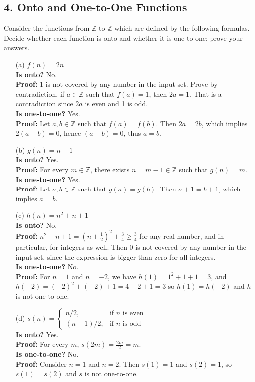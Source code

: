 \documentclass{article}
\begin{document}
\subsection*{4. Onto and One-to-One Functions}

Consider the functions from $\mathbb{Z}$ to $\mathbb{Z}$ which are defined by the following formulas. Decide whether each function is onto and whether it is one-to-one; prove your answers.

\begin{enumerate}
    \item[(a)] $f(n) = 2n$ \\
    \textbf{Is onto?} No. \\
    \textbf{Proof:} 1 is not covered by any number in the input set. Prove by contradiction, if $a \in \mathbb{Z}$ such that $f(a) = 1$, then $2a = 1$. That is a contradiction since $2a$ is even and 1 is odd. \\
    \textbf{Is one-to-one?} Yes. \\
    \textbf{Proof:} Let $a, b \in \mathbb{Z}$ such that $f(a) = f(b)$. Then $2a = 2b$, which implies $2(a - b) = 0$, hence $(a - b) = 0$, thus $a = b$.

    \item[(b)] $g(n) = n + 1$ \\
    \textbf{Is onto?} Yes. \\
    \textbf{Proof:} For every $m \in \mathbb{Z}$, there exists $n = m - 1 \in \mathbb{Z}$ such that $g(n) = m$. \\
    \textbf{Is one-to-one?} Yes. \\
    \textbf{Proof:} Let $a, b \in \mathbb{Z}$ such that $g(a) = g(b)$. Then $a + 1 = b + 1$, which implies $a = b$.

    \item[(c)] $h(n) = n^2 + n + 1$ \\
    \textbf{Is onto?} No. \\
    \textbf{Proof:} $n^2 + n + 1 = (n+\frac{1}{2})^2+\frac{3}{4} \geq \frac{3}{4}$ for any real number, and in particular, for integers as well. Then 0 is not covered by any number in the input set, since the expression is bigger than zero for all integers. \\
    \textbf{Is one-to-one?} No. \\
    \textbf{Proof:} For $n = 1$ and $n = -2$, we have $h(1) = 1^2+1+1 =3$, and $h(-2) = (-2)^2+(-2)+1= 4-2+1=3$ so $h(1)=h(-2)$ and $h$ is not one-to-one.

    \item[(d)] $s(n) = \begin{cases} 
    n/2, & \text{if } n \text{ is even} \\ 
    (n+1)/2, & \text{if } n \text{ is odd} 
    \end{cases}$ \\
    \textbf{Is onto?} Yes. \\
    \textbf{Proof:} For every $m$, $s(2m) = \frac{2m}{2} = m$. \\
    \textbf{Is one-to-one?} No. \\
    \textbf{Proof:} Consider $n = 1$ and $n = 2$. Then $s(1) = 1$ and $s(2) = 1$, so $s(1)=s(2)$ and $s$ is not one-to-one.
\end{enumerate}
\end{document}
